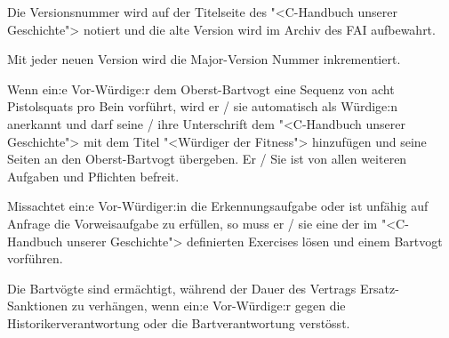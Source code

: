 \documentclass[fontsize=12pt,parskip=half]{scrartcl}
\begin{document}
\begin{contract}
  Die Versionsnummer wird auf der Titelseite des "<C-Handbuch unserer Geschichte"> notiert und die alte Version wird im Archiv des FAI aufbewahrt.

  Mit jeder neuen Version wird die Major-Version Nummer inkrementiert.

  \Clause[title={Fittnessklausel}]
  Wenn ein:e Vor-Würdige:r dem Oberst-Bartvogt eine Sequenz von acht Pistolsquats pro Bein vorführt, wird er / sie automatisch als Würdige:n anerkannt und darf seine / ihre Unterschrift
  dem "<C-Handbuch unserer Geschichte"> mit dem Titel "<Würdiger der Fitness"> hinzufügen und seine Seiten an den Oberst-Bartvogt übergeben. Er / Sie ist von allen weiteren
  Aufgaben und Pflichten befreit.


  \Clause[title={Sanktionen}]\label{H.sanktionen}
  Missachtet ein:e Vor-Würdiger:in die Erkennungsaufgabe  oder ist unfähig auf Anfrage die Vorweisaufgabe  zu erfüllen,
  so muss er / sie eine der im "<C-Handbuch unserer Geschichte"> definierten Exercises lösen und einem Bartvogt vorführen.

  Die Bartvögte sind ermächtigt, während der Dauer des Vertrags Ersatz-Sanktionen zu verhängen, wenn ein:e Vor-Würdige:r gegen die Historikerverantwortung 
  oder die Bartverantwortung  verstösst.


\end{contract}

\pagebreak
\end{document}
